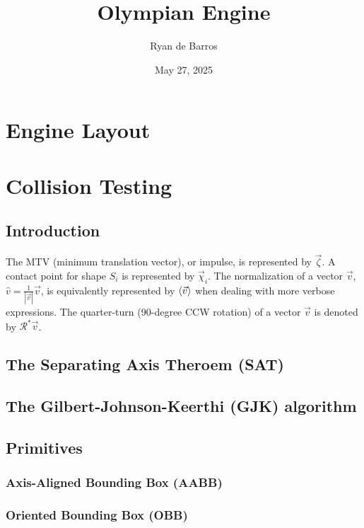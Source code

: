 \documentclass[10pt]{report}
\newcommand{\quarterturn}{\mathcal{R^*}}
\begin{document}
\title{Olympian Engine}
\author{Ryan de Barros}
\date{May 27, 2025}
\maketitle

\tableofcontents

\chapter{Engine Layout}

\chapter{Collision Testing}

\section{Introduction}
The MTV (minimum translation vector), or impulse, is represented by $\vec{\zeta}$. A contact point for shape $S_i$ is represented by $\vec{\chi}_i$. The normalization of a vector $\vec{v}$, $\hat{v}=\frac{1}{|\vec{v}|}\vec{v}$, is equivalently represented by $\braket{\vec{v}}$ when dealing with more verbose expressions. The quarter-turn (90-degree CCW rotation) of a vector $\vec{v}$ is denoted by $\quarterturn\vec{v}$.

\section{The Separating Axis Theroem (SAT)}

\section{The Gilbert-Johnson-Keerthi (GJK) algorithm}

\section{Primitives}

\subsection{Axis-Aligned Bounding Box (AABB)}

\subsection{Oriented Bounding Box (OBB)}
\end{document}
